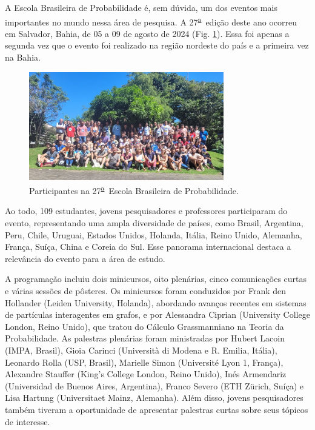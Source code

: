 \documentclass{hipatia}
\newcommand{\superau}{\textsuperscript{\underline{a}}~}
\begin{document}
A Escola Brasileira de Probabilidade é, sem dúvida, um dos eventos mais importantes no mundo nessa área de pesquisa. 
A 27\superau edição deste ano ocorreu em Salvador, Bahia, de 05 a 09 de agosto de 2024 (Fig. \ref{EBP}). 
Essa foi apenas a segunda vez que o evento foi realizado na região nordeste do país e a primeira vez na Bahia.
\begin{figure}[htb]
    \centering
    \includegraphics[width=8.5cm]{EBP.jpg}
    \caption{Participantes na 27\superau Escola Brasileira de Probabilidade.}
 \label{EBP}
\end{figure}

Ao todo, 109 estudantes, jovens pesquisadores e professores participaram do evento, representando uma ampla diversidade de países, como Brasil, Argentina, Peru, Chile, Uruguai, Estados Unidos, Holanda, Itália, Reino Unido, Alemanha, França, Suíça, China e Coreia do Sul. 
Esse panorama internacional destaca a relevância do evento para a área de estudo. 

A programação incluiu dois minicursos, oito plenárias, cinco comunicações curtas e várias sessões de pôsteres. 
Os minicursos foram conduzidos por Frank den Hollander (Leiden University, Holanda), abordando avanços recentes em sistemas de partículas interagentes em grafos, e por Alessandra Ciprian (University College London, Reino Unido), que tratou do Cálculo Grassmanniano na Teoria da Probabilidade. 
As palestras plenárias foram ministradas por Hubert Lacoin (IMPA, Brasil), Gioia Carinci (Università di Modena e R. Emilia, Itália), Leonardo Rolla (USP, Brasil), Marielle Simon (Université Lyon 1, França), Alexandre Stauffer (King's College London, Reino Unido), Inés Armendariz (Universidad de Buenos Aires, Argentina), Franco Severo (ETH Z\"{u}rich, Suíça) e Lisa Hartung (Universitaet Mainz, Alemanha). 
Além disso, jovens pesquisadores também tiveram a oportunidade de apresentar palestras curtas sobre seus tópicos de interesse.
\end{document}
